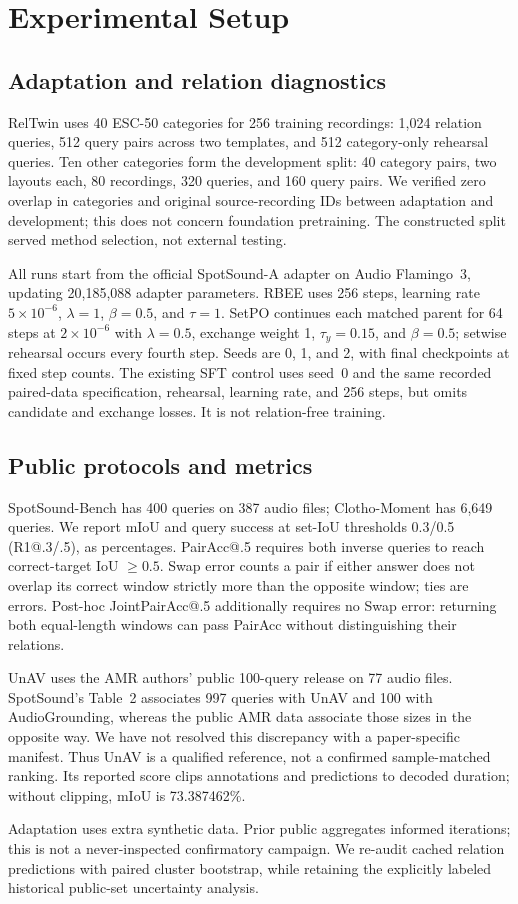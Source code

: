 \section{Experimental Setup}
\subsection{Adaptation and relation diagnostics}
RelTwin uses 40 ESC-50 categories for 256 training recordings: 1,024 relation queries, 512 query pairs across two templates, and 512 category-only rehearsal queries. Ten other categories form the development split: 40 category pairs, two layouts each, 80 recordings, 320 queries, and 160 query pairs. We verified zero overlap in categories and original source-recording IDs between adaptation and development; this does not concern foundation pretraining. The constructed split served method selection, not external testing.

All runs start from the official SpotSound-A adapter on Audio Flamingo~3, updating 20,185,088 adapter parameters. RBEE uses 256 steps, learning rate $5\!\times\!10^{-6}$, $\lambda=1$, $\beta=0.5$, and $\tau=1$. SetPO continues each matched parent for 64 steps at $2\!\times\!10^{-6}$ with $\lambda=0.5$, exchange weight 1, $\tau_y=0.15$, and $\beta=0.5$; setwise rehearsal occurs every fourth step. Seeds are 0, 1, and 2, with final checkpoints at fixed step counts. The existing SFT control uses seed~0 and the same recorded paired-data specification, rehearsal, learning rate, and 256 steps, but omits candidate and exchange losses. It is not relation-free training.

\subsection{Public protocols and metrics}
SpotSound-Bench has 400 queries on 387 audio files; Clotho-Moment has 6,649 queries. We report mIoU and query success at set-IoU thresholds 0.3/0.5 (R1@.3/.5), as percentages. PairAcc@.5 requires both inverse queries to reach correct-target IoU $\geq0.5$. Swap error counts a pair if either answer does not overlap its correct window strictly more than the opposite window; ties are errors. Post-hoc JointPairAcc@.5 additionally requires no Swap error: returning both equal-length windows can pass PairAcc without distinguishing their relations.

UnAV uses the AMR authors' public 100-query release on 77 audio files. SpotSound's Table~2 associates 997 queries with UnAV and 100 with AudioGrounding, whereas the public AMR data associate those sizes in the opposite way. We have not resolved this discrepancy with a paper-specific manifest. Thus UnAV is a qualified reference, not a confirmed sample-matched ranking. Its reported score clips annotations and predictions to decoded duration; without clipping, mIoU is 73.387462\%.

Adaptation uses extra synthetic data. Prior public aggregates informed iterations; this is not a never-inspected confirmatory campaign. We re-audit cached relation predictions with paired cluster bootstrap, while retaining the explicitly labeled historical public-set uncertainty analysis.
